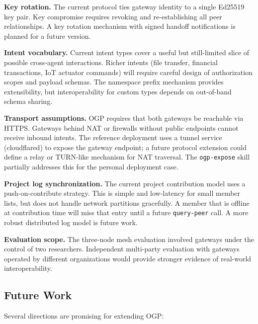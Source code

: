 \documentclass[conference]{IEEEtran}
\begin{document}
\textbf{Key rotation.} The current protocol ties gateway identity to a single Ed25519 key pair. Key compromise requires revoking and re-establishing all peer relationships. A key rotation mechanism with signed handoff notifications is planned for a future version.

\textbf{Intent vocabulary.} Current intent types cover a useful but still-limited slice of possible cross-agent interactions. Richer intents (file transfer, financial transactions, IoT actuator commands) will require careful design of authorization scopes and payload schemas. The namespace prefix mechanism provides extensibility, but interoperability for custom types depends on out-of-band schema sharing.

\textbf{Transport assumptions.} OGP requires that both gateways be reachable via HTTPS. Gateways behind NAT or firewalls without public endpoints cannot receive inbound intents. The reference deployment uses a tunnel service (cloudflared) to expose the gateway endpoint; a future protocol extension could define a relay or TURN-like mechanism for NAT traversal. The \texttt{ogp-expose} skill partially addresses this for the personal deployment case.

\textbf{Project log synchronization.} The current project contribution model uses a push-on-contribute strategy. This is simple and low-latency for small member lists, but does not handle network partitions gracefully. A member that is offline at contribution time will miss that entry until a future \texttt{query-peer} call. A more robust distributed log model is future work.

\textbf{Evaluation scope.} The three-node mesh evaluation involved gateways under the control of two researchers. Independent multi-party evaluation with gateways operated by different organizations would provide stronger evidence of real-world interoperability.

\subsection{Future Work}

Several directions are promising for extending OGP:
\end{document}

